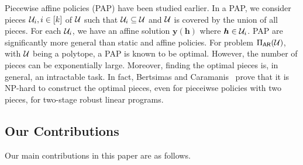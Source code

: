 \documentclass[11pt]{article}
\theoremstyle{plain}
\theoremstyle{definition}
\numberwithin{equation}{section}%
\numberwithin{equation}{section}%
\newcommand{\mb}[1]{\ensuremath{\boldsymbol{#1}}}
\begin{document}
Piecewise affine policies (PAP) have been studied earlier. In a PAP, we consider pieces ${\cal U}_i, i\in[k]$ of ${\cal U}$ such that ${\cal U}_i \subseteq {\cal U}$ and ${\cal U}$ is covered by the union of all pieces. For each ${\cal U}_i$, we have an affine solution $\mb y ( \mb h)$ where $ \mb h \in {\cal U}_i$. PAP are significantly more general than static and affine policies.  For problem  $\Pi_{\sf AR}({\cal U})$, with ${\cal U}$ being a polytope, a PAP is known to be optimal.  However, the number of pieces can be exponentially large.  Moreover, finding the optimal pieces is, in general, an intractable task.  In fact, Bertsimas and Caramanis~\cite{bertsimas2010finite} prove that it is NP-hard to construct the optimal pieces, even for pieceiwse policies with two pieces, for two-stage robust linear programs.  

\subsection{Our Contributions}

Our main contributions in this paper are as follows.
\end{document}
